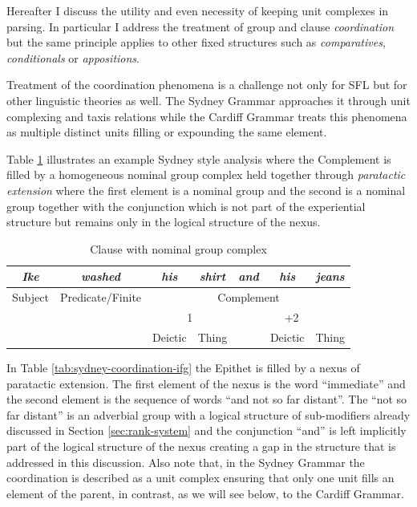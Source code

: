 Hereafter I discuss the utility and even necessity of keeping unit complexes in parsing. In particular I address the treatment of group and clause \textit{coordination} but the same principle applies to other fixed structures such as \textit{comparatives}, \textit{conditionals} or \textit{appositions}.

Treatment of the coordination phenomena is a challenge not only for SFL but for other linguistic theories as well. The Sydney Grammar approaches it through unit complexing and taxis relations while the Cardiff Grammar treats this phenomena as multiple distinct units filling or expounding the same element. 


Table \ref{ex:Sydeny-example-analisys} illustrates an example Sydney style analysis where the Complement is filled by a homogeneous nominal group complex held together through \textit{paratactic extension} where the first element is a nominal group and the second is a nominal group together with the conjunction which is not part of the experiential structure but remains only in the logical structure of the nexus. 

\begin{table}[!ht]
    \centering
    \begin{tabular}{cc|c|c|c|c|c|}
        \hline
        \multicolumn{1}{|c|}{\textit{Ike}} & \textit{washed} & \textit{his} & \textit{shirt} & \textit{and} & \textit{his} & \textit{jeans} \\ \hline
        \multicolumn{1}{|c|}{Subject} & Predicate/Finite & \multicolumn{5}{c|}{Complement} \\ \hline
        &  & \multicolumn{2}{c|}{1} & \multicolumn{3}{c|}{+2} \\ \cline{3-7} 
        &  & Deictic & Thing &  & Deictic & Thing \\ \cline{3-4} \cline{6-7} 
    \end{tabular}
    \caption{Clause with nominal group complex}
    \label{ex:Sydeny-example-analisys}
\end{table}

In Table \ref{tab:sydney-coordination-ifg} the Epithet is filled by a nexus of paratactic extension. The first element of the nexus is the word ``immediate'' and the second element is the sequence of words ``and not so far distant''. The ``not so far distant'' is an adverbial group with a logical structure of sub-modifiers already discussed in Section \ref{sec:rank-system} and the conjunction ``and'' is left implicitly part of the logical structure of the nexus creating a gap in the structure that is addressed in this discussion. Also note that, in the Sydney Grammar the coordination is described as a unit complex ensuring that only one unit fills an element of the parent, in contrast, as we will see below, to the Cardiff Grammar. 

